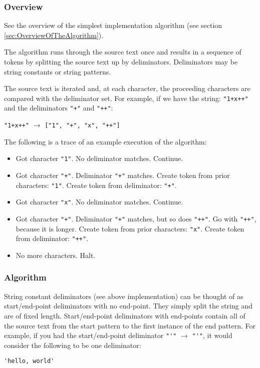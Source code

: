 \documentclass[10pt,a4paper]{article}
\begin{document}
\subsubsection{Overview}
See the overview of the simplest implementation algorithm (see section \ref{sec:OverviewOfTheAlgorithm}).

The algorithm runs through the source text once and results in a sequence of tokens by splitting the source text up by deliminators. Deliminators may be string constants or string patterns. 

The source text is iterated and, at each character, the proceeding characters are compared with the deliminator set. For example, if we have the string: \verb|"1+x++"| and the deliminators \verb|"+"| and \verb|"++"|: \newline

\verb|"1+x++"| $\rightarrow$ \verb|["1", "+", "x", "++"]| \newline

The following is a trace of an example execution of the algorithm:
\begin{itemize}
\item Got character \verb|"1"|. No deliminator matches. Continue.
\item Got character \verb|"+"|. Deliminator \verb|"+"| matches. Create token from prior characters: \verb|"1"|. Create token from deliminator: \verb|"+"|.
\item Got character \verb|"x"|. No deliminator matches. Continue.
\item Got character \verb|"+"|. Deliminator \verb|"+"| matches, but so does \verb|"++"|. Go with \verb|"++"|, because it is longer. Create token from prior characters: \verb|"x"|. Create token from deliminator: \verb|"++"|.
\item No more characters. Halt.
\end{itemize}

\newpage
\subsubsection{Algorithm}
String constant deliminators (see above implementation) can be thought of as start/end-point deliminators with no end-point. They simply split the string and are of fixed length. Start/end-point deliminators with end-points contain all of the source text from the start pattern to the first instance of the end pattern. For example, if you had the start/end-point deliminator \verb|"'"| $\rightarrow$ \verb|"'"|, it would consider the following to be one deliminator:
\begin{verbatim}
'hello, world'
\end{verbatim}
\end{document}
